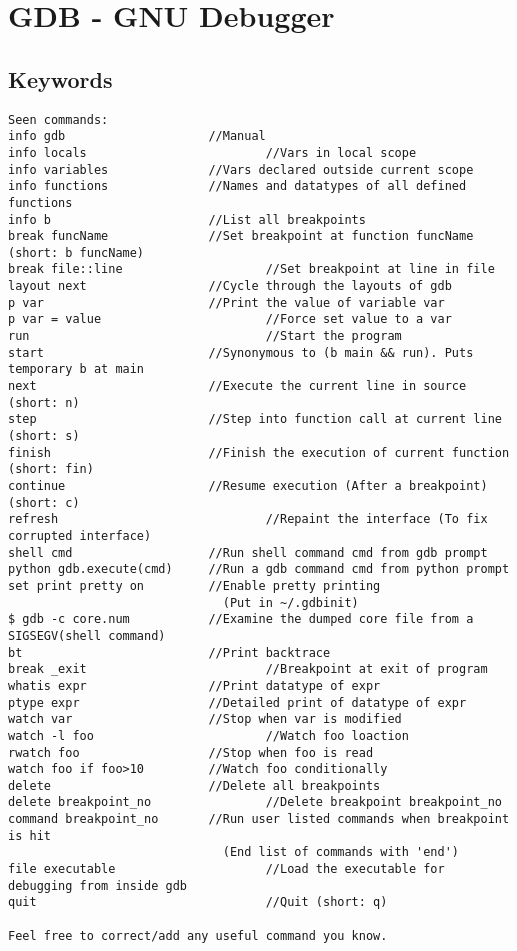\documentclass[openany]{report}
\begin{document}
\chapter{GDB - GNU Debugger}

\section{Keywords}

\begin{verbatim}
Seen commands:
info gdb 					//Manual
info locals 				        //Vars in local scope
info variables				//Vars declared outside current scope
info functions				//Names and datatypes of all defined functions
info b 						//List all breakpoints
break funcName				//Set breakpoint at function funcName (short: b funcName)
break file::line			        //Set breakpoint at line in file
layout next					//Cycle through the layouts of gdb
p var 						//Print the value of variable var
p var = value 			        	//Force set value to a var
run 						        //Start the program
start 						//Synonymous to (b main && run). Puts temporary b at main
next 						//Execute the current line in source (short: n)
step 						//Step into function call at current line (short: s)
finish						//Finish the execution of current function (short: fin)
continue					//Resume execution (After a breakpoint) (short: c)
refresh 					        //Repaint the interface (To fix corrupted interface)
shell cmd 					//Run shell command cmd from gdb prompt
python gdb.execute(cmd)		//Run a gdb command cmd from python prompt
set print pretty on			//Enable pretty printing
							  (Put in ~/.gdbinit)
$ gdb -c core.num			//Examine the dumped core file from a SIGSEGV(shell command)
bt							//Print backtrace
break _exit 				        //Breakpoint at exit of program
whatis expr					//Print datatype of expr
ptype expr					//Detailed print of datatype of expr
watch var 					//Stop when var is modified
watch -l foo				        //Watch foo loaction
rwatch foo					//Stop when foo is read
watch foo if foo>10			//Watch foo conditionally
delete						//Delete all breakpoints
delete breakpoint_no		        //Delete breakpoint breakpoint_no
command breakpoint_no		//Run user listed commands when breakpoint is hit
							  (End list of commands with 'end')
file executable 			        //Load the executable for debugging from inside gdb
quit						        //Quit (short: q)

Feel free to correct/add any useful command you know.
\end{verbatim}
\end{document}
